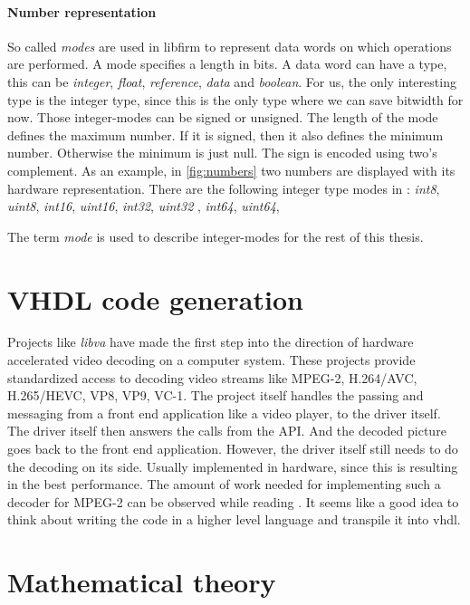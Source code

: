\paragraph{Number representation}
So called \textit{modes} are used in libfirm to represent data words on which operations are performed. A mode specifies a length in bits. A data word can have a type, this can be \textit{integer}, \textit{float}, \textit{reference}, \textit{data} and \textit{boolean}. For us, the only interesting type is the integer type, since this is the only type where we can save bitwidth for now. Those integer-modes can be signed or unsigned. The length of the mode defines the maximum number. If it is signed, then it also defines the minimum number. Otherwise the minimum is just null. The sign is encoded using two's complement. As an example, in \autoref{fig:numbers} two numbers are displayed with its hardware representation. There are the following integer type modes in \libFIRM : 
\textit{int8},
\textit{uint8},
\textit{int16},
\textit{uint16},
\textit{int32},
\textit{uint32} ,
\textit{int64},
\textit{uint64},

The term \textit{mode} is used to describe integer-modes for the rest of this thesis.

\section{VHDL code generation}
Projects like \textit{libva} have made the first step into the direction of hardware accelerated video decoding on a computer system. These projects provide standardized access to decoding video streams like MPEG-2, H.264/AVC, H.265/HEVC, VP8, VP9, VC-1. The project itself handles the passing and messaging from a front end application like a video player, to the driver itself. The driver itself then answers the calls from the API. And the decoded picture goes back to the front end application. However, the driver itself still needs to do the decoding on its side. Usually implemented in hardware, since this is resulting in the best performance. The amount of work needed for implementing such a decoder for MPEG-2 can be observed while reading \cite{mpeg2-modelling}.
It seems like a good idea to think about writing the code in a higher level language and transpile it into vhdl. 

\section{Mathematical theory}

